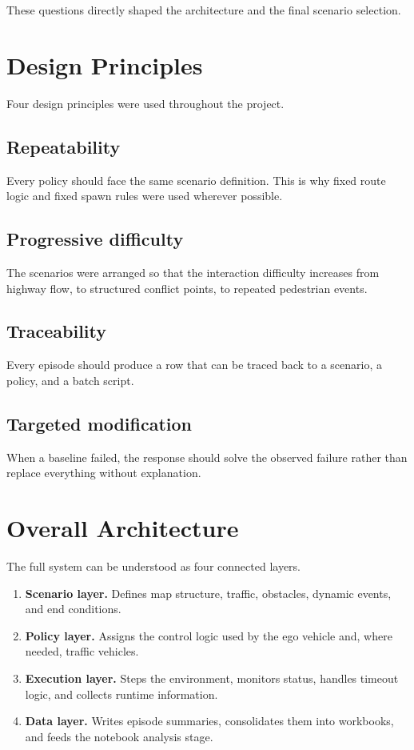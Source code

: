 \documentclass[12pt,a4paper]{report}
\begin{document}
These questions directly shaped the architecture and the final scenario selection.

\section{Design Principles}
Four design principles were used throughout the project.

\subsection*{Repeatability}
Every policy should face the same scenario definition. This is why fixed route logic and fixed spawn rules were used wherever possible.

\subsection*{Progressive difficulty}
The scenarios were arranged so that the interaction difficulty increases from highway flow, to structured conflict points, to repeated pedestrian events.

\subsection*{Traceability}
Every episode should produce a row that can be traced back to a scenario, a policy, and a batch script.

\subsection*{Targeted modification}
When a baseline failed, the response should solve the observed failure rather than replace everything without explanation.

\section{Overall Architecture}
The full system can be understood as four connected layers.

\begin{enumerate}[label=\textbf{L\arabic*:}, leftmargin=2.2cm]
    \item \textbf{Scenario layer.} Defines map structure, traffic, obstacles, dynamic events, and end conditions.
    \item \textbf{Policy layer.} Assigns the control logic used by the ego vehicle and, where needed, traffic vehicles.
    \item \textbf{Execution layer.} Steps the environment, monitors status, handles timeout logic, and collects runtime information.
    \item \textbf{Data layer.} Writes episode summaries, consolidates them into workbooks, and feeds the notebook analysis stage.
\end{enumerate}
\end{document}
